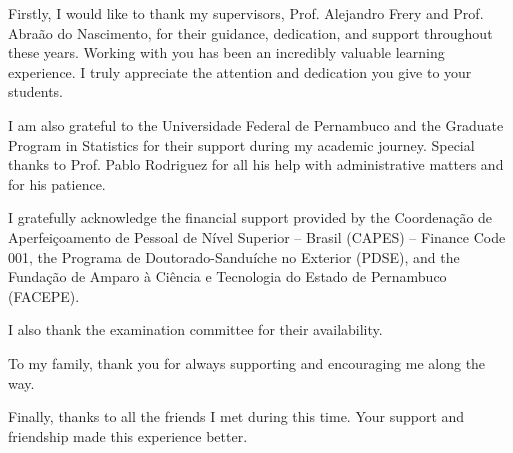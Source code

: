 Firstly, I would like to thank my supervisors, Prof. Alejandro Frery and Prof. Abraão do Nascimento, for their guidance, dedication, and support throughout these years. 
Working with you has been an incredibly valuable learning experience. 
I truly appreciate the attention and dedication you give to your students.

I am also grateful to the Universidade Federal de Pernambuco and the 
Graduate Program in Statistics for their support during my academic journey. 
Special thanks to Prof. Pablo Rodriguez for all his help with administrative matters and for his patience.

I gratefully acknowledge the financial support provided by the Coordenação de Aperfeiçoamento de Pessoal de Nível Superior – Brasil (CAPES) – Finance Code 001, 
the Programa de Doutorado-Sanduíche no Exterior (PDSE), and the Fundação de Amparo à Ciência e Tecnologia do Estado de Pernambuco (FACEPE).

I also thank the examination committee for their availability.

To my family, thank you for always supporting and encouraging me along the way.

Finally, thanks to all the friends I met during this time. Your support and friendship 
made this experience better.